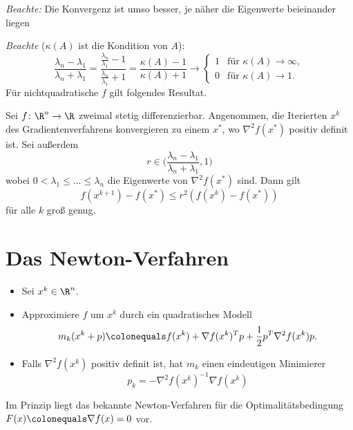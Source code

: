 \medskip

\emph{Beachte:} Die Konvergenz ist umso besser, je näher die Eigenwerte beieinander liegen

\medskip

\emph{Beachte} ($\kappa (A)$ ist die Kondition von $A$):
\begin{equation*}
 \frac{\lambda_n-\lambda_1}{\lambda_n+\lambda_1}
 =
 \frac{\frac{\lambda_n}{\lambda_1}-1}{\frac{\lambda_n}{\lambda_1}+1}
 =
 \frac{\kappa(A)-1}{\kappa(A)+1}
 \to
 \begin{cases}
  1 & \text{für $\kappa(A) \to \infty$}, \\
  0 & \text{für $\kappa(A) \to 1$}.
 \end{cases}
\end{equation*}
Für nichtquadratische $f$ gilt folgendes Resultat.
\begin{satz}
Sei $f \colon \R^n \to \R$ zweimal stetig differenzierbar. Angenommen, die Iterierten $x^k$ des Gradientenverfahrens konvergieren zu einem $x^*$, wo $\nabla^2 f (x^* )$ positiv definit ist. Sei außerdem
\begin{equation*}
 r \in \bigg( \frac{\lambda_n-\lambda_1}{\lambda_n+\lambda_1},1 \bigg)
\end{equation*}
wobei $0 <\lambda_1 \leq \ldots \leq \lambda_n$ die Eigenwerte von $\nabla^2 f(x^*)$ sind.
Dann gilt
\begin{equation*}
 f(x^{k+1})-f(x^*) \leq r^2 (f(x^k)-f(x^*) )
\end{equation*}
für alle $k$ groß genug.
\end{satz}


\section{Das Newton-Verfahren}

\begin{itemize}
 \item Sei $x^k \in \R^n$.

 \item Approximiere $f$ um $x^k$ durch ein quadratisches Modell
  \begin{equation*}
   m_k (x^k+p) \colonequals f(x^k)+\nabla f (x^k )^Tp+\frac{1}{2} p^T \nabla ^2 f(x^k)p.
  \end{equation*}

  \item Falls $\nabla^2 f(x^k)$ positiv definit ist, hat $m_k$ einen eindeutigen Minimierer
   \begin{equation*}
    p_k = -\nabla^2 f (x^k )^{-1} \nabla f (x^k )
   \end{equation*}
\end{itemize}
Im Prinzip liegt das bekannte Newton-Verfahren für die Optimalitätsbedingung $F(x) \colonequals \nabla f(x)=0$ vor.

